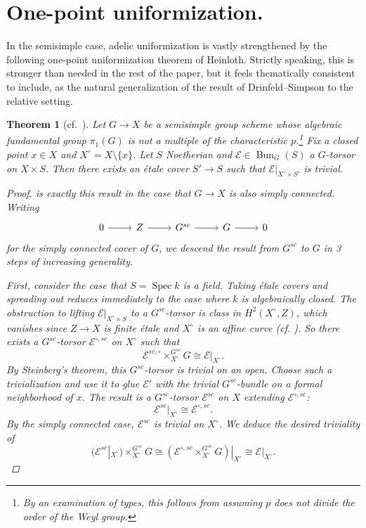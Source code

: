\documentclass[openany]{amsbook}
\newtheorem{theorem}{Theorem}[chapter]
\theoremstyle{definition}
\theoremstyle{remark}
\numberwithin{equation}{section}
\newcommand{\cE}{\mathcal{E}}
\renewcommand{\-}{\operatorname{-}}
\newcommand{\Spec}{\operatorname{Spec}}
\newcommand{\on}[1]{\operatorname{#1}}
\begin{document}
\section{One-point uniformization.} In the semisimple case, adelic uniformization is vastly strengthened by the following one-point uniformization theorem of Heinloth. Strictly speaking, this is stronger than needed in the rest of the paper, but it feels thematically consistent to include, as the natural generalization of the result of Drinfeld--Simpson to the relative setting. 

\begin{theorem}[{cf.\ {\cite{HeinlothRelUnif}}}] \label{thm.heinlothunif}
    Let $G \to X$ be a semisimple group scheme whose algebraic fundamental group $\pi_1(G)$ is not a multiple of the characteristic $p$.\footnote{By an examination of types, this follows from assuming $p$ does not divide the order of the Weyl group.} Fix a closed point $x \in X$ and $X^\circ = X \setminus \{x\}$. Let $S$ Noetherian and $\cE \in \on{Bun}_G(S)$ a $G$-torsor on $X \times S$. Then there exists an \'etale cover $S' \to S$ such that $\cE|_{X^\circ \times S'}$ is trivial. 
    \begin{proof}
        \cite[Thm. 4]{HeinlothRelUnif} is exactly this result in the case that $G \to X$ is also simply connected. Writing 
        \[
            \begin{tikzcd}
            0 \ar[r] & Z \ar[r] & G^{sc} \ar[r] & G \ar[r] & 0
        \end{tikzcd}
        \]
        for the simply connected cover of $G$, we descend the result from $G^{sc}$ to $G$ in 3 steps of increasing generality.

        First, consider the case that $S = \Spec k$ is a field. Taking \'etale covers and spreading out reduces immediately to the case where $k$ is algebraically closed. The obstruction to lifting $\cE|_{X^\circ \times S}$ to a $G^{sc}$-torsor is class in $H^2(X^{\circ}, Z)$, which vanishes since $Z \to X$ is finite \'etale and $X^\circ$ is an affine curve (cf. \cite[Tag 03SC]{stacks-project}). So there exists a $G^{sc}$-torsor $\cE^{\circ, sc}$ on $X^\circ$ such that $$\cE^{sc, \circ} \times^{G^{sc}}_{X^\circ} G \cong \cE|_{X^\circ}.$$ By Steinberg's theorem, this $G^{sc}$-torsor is trivial on an open. Choose such a trivialization and use it to glue $\cE'$ with the trivial $G^{sc}$-bundle on a formal neighborhood of $x$. The result is a $G^{sc}$-torsor $\cE^{sc}$ on $X$ extending $\cE^{\circ, sc}$: 
        \[
            \cE^{sc}|_{X^\circ} \cong \cE^{\circ, sc}.
        \]
        By the simply connected case, $\cE^{sc}$ is trivial on $X^{\circ}$. We deduce the desired triviality of
        \[
            (\cE^{sc}|_{X^\circ}) \times_{X^\circ}^{G^{sc}} G \cong (\cE^{\circ, sc} \times^{G^{sc}}_{X^{\circ}} G)|_{X^\circ} \cong \cE|_{X^\circ}.
        \]


\end{proof}
\end{theorem}
\end{document}
